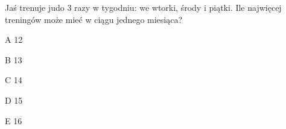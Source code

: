 \begin{tresc}
Jaś trenuje judo 3 razy w tygodniu: we wtorki, środy i piątki. Ile najwięcej treningów może mieć w ciągu jednego miesiąca?
\end{tresc}
\begin{wariant}{A} 12 \end{wariant}
\begin{wariant}{B} 13 \end{wariant}
\begin{wariant}{C} 14 \end{wariant}
\begin{wariant}{D} 15 \end{wariant}
\begin{wariant}{E} 16 \end{wariant}
